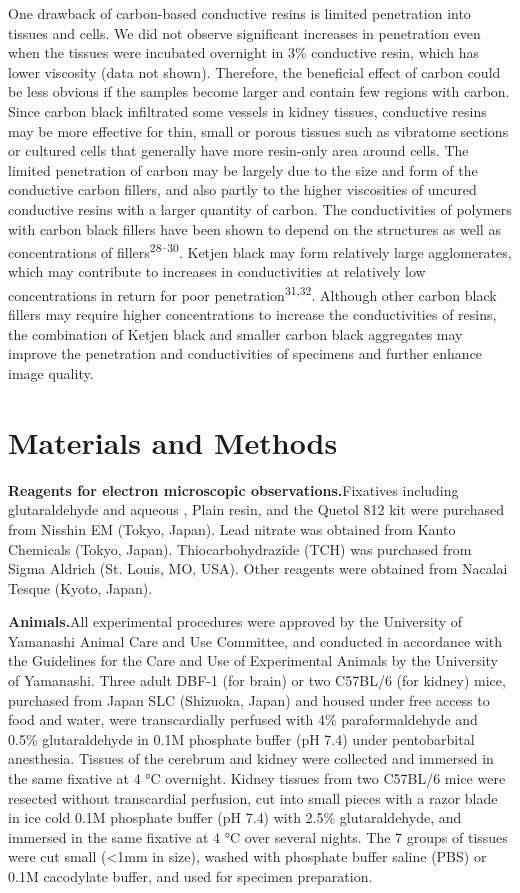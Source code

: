 \documentclass{article}
\begin{document}
One drawback of carbon-based conductive resins is limited penetration into tissues and cells. We did not observe significant increases in penetration even when the tissues were incubated overnight in 3\% conductive resin, which has lower viscosity (data not shown). Therefore, the beneficial effect of carbon could be less obvious if the samples become larger and contain few regions with carbon. Since carbon black infiltrated some vessels in kidney tissues, conductive resins may be more effective for thin, small or porous tissues such as vibratome sections or cultured cells that generally have more resin-only area around cells. The limited penetration of carbon may be largely due to the size and form of the conductive carbon fillers, and also partly to the higher viscosities of uncured conductive resins with a larger quantity of carbon. The conductivities of polymers with carbon black fillers have been shown to depend on the structures as well as concentrations of fillers\textsuperscript{28–30}. Ketjen black may form relatively large agglomerates, which may contribute to increases in conductivities at relatively low concentrations in return for poor penetration\textsuperscript{31,32}. Although other carbon black fillers may require higher concentrations to increase the conductivities of resins, the combination of Ketjen black and smaller carbon black aggregates may improve the penetration and conductivities of specimens and further enhance image quality.

\section*{Materials and Methods}

\noindent\textbf{Reagents for electron microscopic observations.}\quad Fixatives including glutaraldehyde and aqueous , Plain resin, and the Quetol 812 kit were purchased from Nisshin EM (Tokyo, Japan). Lead nitrate was obtained from Kanto Chemicals (Tokyo, Japan). Thiocarbohydrazide (TCH) was purchased from Sigma Aldrich (St. Louis, MO, USA). Other reagents were obtained from Nacalai Tesque (Kyoto, Japan).

\noindent\textbf{Animals.}\quad All experimental procedures were approved by the University of Yamanashi Animal Care and Use Committee, and conducted in accordance with the Guidelines for the Care and Use of Experimental Animals by the University of Yamanashi. Three adult DBF-1 (for brain) or two C57BL/6 (for kidney) mice, purchased from Japan SLC (Shizuoka, Japan) and housed under free access to food and water, were transcardially perfused with 4\% paraformaldehyde and 0.5\% glutaraldehyde in 0.1M phosphate buffer (pH 7.4) under pentobarbital anesthesia. Tissues of the cerebrum and kidney were collected and immersed in the same fixative at 4 °C overnight. Kidney tissues from two C57BL/6 mice were resected without transcardial perfusion, cut into small pieces with a razor blade in ice cold 0.1M phosphate buffer (pH 7.4) with 2.5\% glutaraldehyde, and immersed in the same fixative at 4 °C over several nights. The 7 groups of tissues were cut small (<1mm in size), washed with phosphate buffer saline (PBS) or 0.1M cacodylate buffer, and used for specimen preparation.
\end{document}
